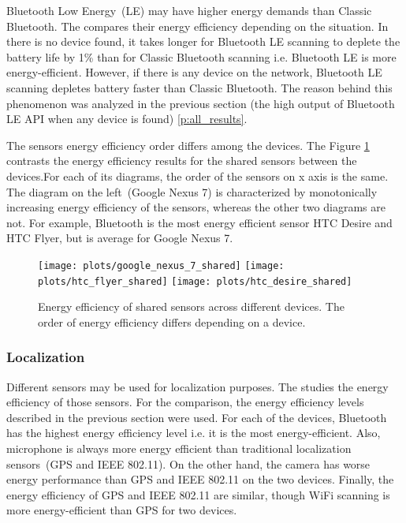 Bluetooth Low Energy\ (LE) may have higher energy demands than Classic Bluetooth. The  compares their energy efficiency depending on the situation. In there is no device found, it takes longer for Bluetooth LE scanning to deplete the battery life by 1\% than for Classic Bluetooth scanning i.e. Bluetooth LE is more energy-efficient. However, if there is any device on the network, Bluetooth LE scanning depletes battery faster than Classic Bluetooth. The reason behind this phenomenon was analyzed in the previous section (the high output of Bluetooth LE API when any device is found) \ref{p:all_results}.
	
				
The sensors energy efficiency order differs among the devices. The Figure \ref{p:shared_sensors_results} contrasts the energy efficiency results for the shared sensors between the devices.For each of its diagrams, the order of the sensors on x axis is the same. The diagram on the left\ (Google Nexus 7) is characterized by monotonically increasing energy efficiency of the sensors, whereas the other two diagrams are not. For example, Bluetooth is the most energy efficient sensor HTC Desire and HTC Flyer, but is average for Google Nexus 7.
	
\begin{figure}[H]
\centering
\texttt{[image: plots/google\_nexus\_7\_shared]}
\texttt{[image: plots/htc\_flyer\_shared]}
\texttt{[image: plots/htc\_desire\_shared]}
\caption{\label{p:shared_sensors_results} Energy efficiency of shared sensors across different devices. The order of energy efficiency differs depending on a device. }
\end{figure}		
		
\subsubsection{Localization}

\hspace{10pt} Different sensors may be used for localization purposes. The  studies the energy efficiency of those sensors. For the comparison, the energy efficiency levels described in the previous section were used. For each of the devices, Bluetooth has the highest energy efficiency level i.e. it is the most energy-efficient. Also, microphone is always more energy efficient than traditional localization sensors\ (GPS and IEEE 802.11). On the other hand, the camera has worse energy performance than GPS and IEEE 802.11 on the two devices. Finally, the energy efficiency of GPS and IEEE 802.11 are similar, though WiFi scanning is more energy-efficient than GPS for two devices.  	

